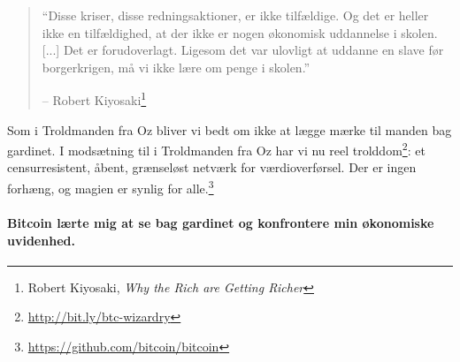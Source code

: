 \begin{quotation}\begin{samepage}
\enquote{Disse kriser, disse redningsaktioner, er ikke tilfældige. Og det er heller ikke en
tilfældighed, at der ikke er nogen økonomisk uddannelse i skolen. [...] Det er
forudoverlagt. Ligesom det var ulovligt at uddanne en slave før borgerkrigen,
må vi ikke lære om penge i skolen.}
\begin{flushright} -- Robert Kiyosaki\footnote{Robert Kiyosaki, \textit{Why the Rich
are Getting Richer}\cite{robert-kiyosaki}}
\end{flushright}\end{samepage}\end{quotation}

Som i Troldmanden fra Oz bliver vi bedt om ikke at lægge mærke til manden bag gardinet. I modsætning til i Troldmanden fra Oz har vi nu reel
trolddom\footnote{\url{http://bit.ly/btc-wizardry}}: et censurresistent, åbent, grænseløst netværk for værdioverførsel. Der er ingen forhæng, og magien er synlig for alle.\footnote{\url{https://github.com/bitcoin/bitcoin}}

\paragraph{Bitcoin lærte mig at se bag gardinet og konfrontere min økonomiske uvidenhed.}

%
%
%
%
